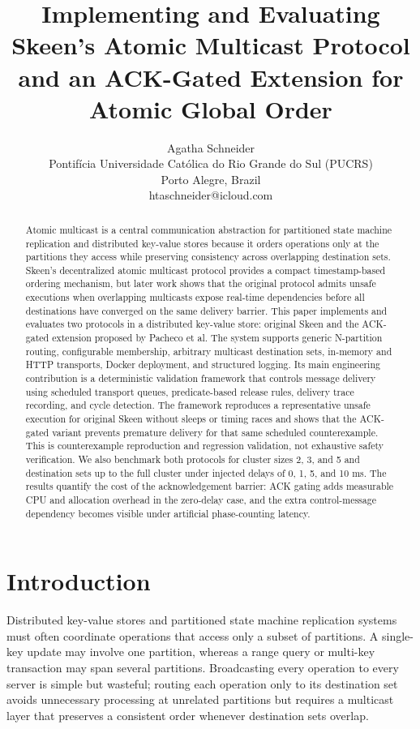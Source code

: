 \documentclass[conference]{IEEEtran}
\title{Implementing and Evaluating Skeen's Atomic Multicast Protocol and an ACK-Gated Extension for Atomic Global Order}
\author{Agatha Schneider\\
Pontifícia Universidade Católica do Rio Grande do Sul (PUCRS)\\
Porto Alegre, Brazil\\
htaschneider@icloud.com
}
\date{}
\begin{document}
\maketitle

\begin{abstract}
Atomic multicast is a central communication abstraction for partitioned state machine replication and distributed key-value stores because it orders operations only at the partitions they access while preserving consistency across overlapping destination sets. Skeen's decentralized atomic multicast protocol provides a compact timestamp-based ordering mechanism, but later work shows that the original protocol admits unsafe executions when overlapping multicasts expose real-time dependencies before all destinations have converged on the same delivery barrier. This paper implements and evaluates two protocols in a distributed key-value store: original Skeen and the ACK-gated extension proposed by Pacheco et al. The system supports generic N-partition routing, configurable membership, arbitrary multicast destination sets, in-memory and HTTP transports, Docker deployment, and structured logging. Its main engineering contribution is a deterministic validation framework that controls message delivery using scheduled transport queues, predicate-based release rules, delivery trace recording, and cycle detection. The framework reproduces a representative unsafe execution for original Skeen without sleeps or timing races and shows that the ACK-gated variant prevents premature delivery for that same scheduled counterexample. This is counterexample reproduction and regression validation, not exhaustive safety verification. We also benchmark both protocols for cluster sizes 2, 3, and 5 and destination sets up to the full cluster under injected delays of 0, 1, 5, and 10 ms. The results quantify the cost of the acknowledgement barrier: ACK gating adds measurable CPU and allocation overhead in the zero-delay case, and the extra control-message dependency becomes visible under artificial phase-counting latency.
\end{abstract}

\section{Introduction}

Distributed key-value stores and partitioned state machine replication systems must often coordinate operations that access only a subset of partitions. A single-key update may involve one partition, whereas a range query or multi-key transaction may span several partitions. Broadcasting every operation to every server is simple but wasteful; routing each operation only to its destination set avoids unnecessary processing at unrelated partitions but requires a multicast layer that preserves a consistent order whenever destination sets overlap.
\end{document}
